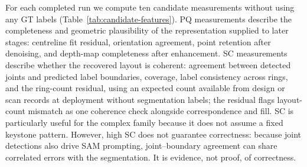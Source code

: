 \documentclass[a4paper,fleqn]{cas-dc}
\begin{document}
For each completed run we compute ten candidate measurements without using any GT labels (Table~\ref{tab:candidate-features}). PQ measurements describe the completeness and geometric plausibility of the representation supplied to later stages: centreline fit residual, orientation agreement, point retention after denoising, and depth-map completeness after enhancement. SC measurements describe whether the recovered layout is coherent: agreement between detected joints and predicted label boundaries, coverage, label consistency across rings, and the ring-count residual, using an expected count available from design or scan records at deployment without segmentation labels; the residual flags layout-count mismatch as one coherence check alongside correspondence and fill. SC is particularly useful for the complex family because it does not assume a fixed keystone pattern. However, high SC does not guarantee correctness: because joint detections also drive SAM prompting, joint--boundary agreement can share correlated errors with the segmentation. It is evidence, not proof, of correctness.
\end{document}
